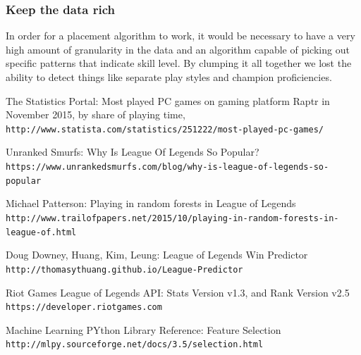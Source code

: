 \documentclass{article} %
\begin{document}
\subsubsection{Keep the data rich}
In order for a placement algorithm to work, it would be necessary to have a very high amount of granularity in the data and an algorithm capable of picking out specific patterns that indicate skill level. By clumping it all together we lost the ability to detect things like separate play styles and champion proficiencies.
\newpage
\begin{thebibliography}{9}
 
The Statistics Portal: Most played PC games on gaming platform Raptr in November 2015, by share of playing time,
\\\texttt{http://www.statista.com/statistics/251222/most-played-pc-games/}
 
Unranked Smurfs: Why Is League Of Legends So Popular?
\\\texttt{https://www.unrankedsmurfs.com/blog/why-is-league-of-legends-so-popular}
 
Michael Patterson: Playing in random forests in League of Legends
\\\texttt{http://www.trailofpapers.net/2015/10/playing-in-random-forests-in-league-of.html}
 
Doug Downey, Huang, Kim, Leung: League of Legends Win Predictor
\\\texttt{http://thomasythuang.github.io/League-Predictor}
 
Riot Games League of Legends API: Stats Version v1.3, and Rank Version v2.5
\\\texttt{https://developer.riotgames.com}

Machine Learning PYthon Library Reference: Feature Selection
\\\texttt{http://mlpy.sourceforge.net/docs/3.5/selection.html}

\end{thebibliography}
\end{document}
